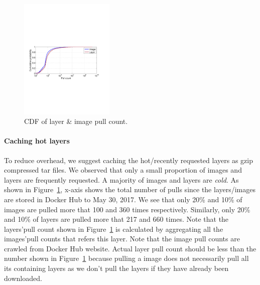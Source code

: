 \begin{figure}
	\centering
	\includegraphics[width=0.4\textwidth]{graphs/pull-cnt.pdf}
	\caption{CDF of layer \& image pull count.
	}
	\label{fig:pull-cnt}
\end{figure}

\paragraph{Caching hot layers}
To reduce overhead, we suggest caching the hot/recently requested layers as
gzip compressed tar files.  We observed that only a small proportion of images
and layers are frequently requested. A majority of images and layers are
\textit{cold}. As shown in Figure~\ref{fig:pull-cnt}, x-axis shows the total
number of pulls since the layers/images are stored in Docker Hub to May 30,
2017.  We see that only 20\% and 10\% of images are pulled more that 100 and
360 times respectively. Similarly, only 20\% and 10\% of layers are pulled more
that 217 and 660 times.  Note that the layers'pull count shown in
Figure~\ref{fig:pull-cnt} is calculated by aggregating all the images'pull
counts that refers this layer. Note that the image pull counts are crawled from
Docker Hub website. Actual layer pull count should be less than the number
shown in Figure~\ref{fig:pull-cnt} because pulling a image does not necessarily
pull all its containing layers as we don't pull the layers if they have already
been downloaded.



